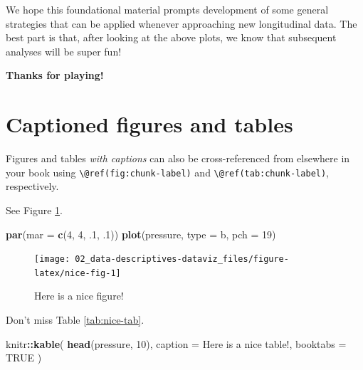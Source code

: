 \documentclass[
]{book}
\newenvironment{Shaded}{\begin{snugshade}}{\end{snugshade}}
\newcommand{\AttributeTok}[1]{\textcolor[rgb]{0.13,0.29,0.53}{#1}}
\newcommand{\ConstantTok}[1]{\textcolor[rgb]{0.56,0.35,0.01}{#1}}
\newcommand{\DecValTok}[1]{\textcolor[rgb]{0.00,0.00,0.81}{#1}}
\newcommand{\FunctionTok}[1]{\textcolor[rgb]{0.13,0.29,0.53}{\textbf{#1}}}
\newcommand{\NormalTok}[1]{#1}
\newcommand{\SpecialCharTok}[1]{\textcolor[rgb]{0.81,0.36,0.00}{\textbf{#1}}}
\newcommand{\StringTok}[1]{\textcolor[rgb]{0.31,0.60,0.02}{#1}}
\theoremstyle{definition}
\theoremstyle{definition}
\theoremstyle{definition}
\theoremstyle{definition}
\theoremstyle{remark}
\begin{document}
We hope this foundational material prompts development of some general strategies that can be applied whenever approaching new longitudinal data.
The best part is that, after looking at the above plots, we know that subsequent analyses will be super fun!

\textbf{Thanks for playing!}

\section{Captioned figures and tables}\label{captioned-figures-and-tables}

Figures and tables \emph{with captions} can also be cross-referenced from elsewhere in your book using \texttt{\textbackslash{}@ref(fig:chunk-label)} and \texttt{\textbackslash{}@ref(tab:chunk-label)}, respectively.

See Figure \ref{fig:nice-fig}.

\begin{Shaded}
\begin{Highlighting}[]
\FunctionTok{par}\NormalTok{(}\AttributeTok{mar =} \FunctionTok{c}\NormalTok{(}\DecValTok{4}\NormalTok{, }\DecValTok{4}\NormalTok{, .}\DecValTok{1}\NormalTok{, .}\DecValTok{1}\NormalTok{))}
\FunctionTok{plot}\NormalTok{(pressure, }\AttributeTok{type =} \StringTok{\textquotesingle{}b\textquotesingle{}}\NormalTok{, }\AttributeTok{pch =} \DecValTok{19}\NormalTok{)}
\end{Highlighting}
\end{Shaded}

\begin{figure}

{\centering \texttt{[image: 02\_data-descriptives-dataviz\_files/figure-latex/nice-fig-1]} 

}

\caption{Here is a nice figure!}\label{fig:nice-fig}
\end{figure}

Don't miss Table \ref{tab:nice-tab}.

\begin{Shaded}
\begin{Highlighting}[]
\NormalTok{knitr}\SpecialCharTok{::}\FunctionTok{kable}\NormalTok{(}
  \FunctionTok{head}\NormalTok{(pressure, }\DecValTok{10}\NormalTok{), }\AttributeTok{caption =} \StringTok{\textquotesingle{}Here is a nice table!\textquotesingle{}}\NormalTok{,}
  \AttributeTok{booktabs =} \ConstantTok{TRUE}
\NormalTok{)}
\end{Highlighting}
\end{Shaded}
\end{document}
